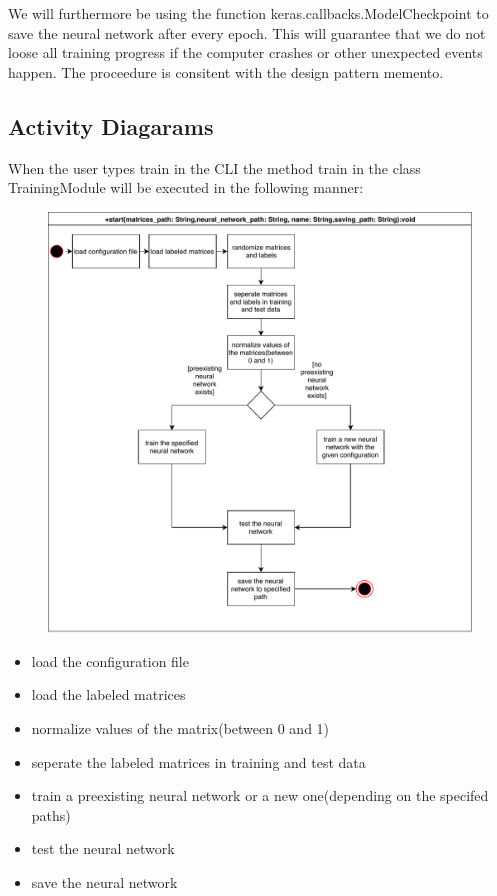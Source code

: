 \documentclass[parskip=full]{scrartcl}
\begin{document}
We will furthermore be using the function keras.callbacks.ModelCheckpoint to save the \gls{neural network} after every epoch.
This will guarantee that we do not loose all training progress if the computer crashes or other unexpected events happen.
The proceedure is consitent with the design pattern \gls{memento}.


\subsection{Activity Diagarams}
When the user types train in the \gls{CLI} the method train in the class TrainingModule will be executed in the following manner:

\begin{figure}[h]
\begin{center}
\includegraphics[scale=0.9]{ActivityDiagrams/PDF/TrainingModule}
\label{Activity Diagrams}
\end{center}
\end{figure}

\begin{itemize}
\item load the configuration file
\item load the labeled matrices
\item normalize values of the matrix(between 0 and 1)
\item seperate the labeled matrices in training and test data
\item train a preexisting \gls{neural network} or a new one(depending on the specifed paths)
\item test the \gls{neural network}
\item save the \gls{neural network}
\end{itemize}
\end{document}
